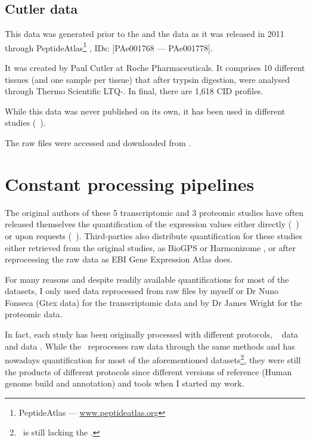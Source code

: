 \subsection{Cutler data}

This data was generated prior to the  and the 
data as it was released in 2011 through PeptideAtlas\footnote{PeptideAtlas --- %
\href{http://www.peptideatlas.org/}{www.peptideatlas.org}}
, IDs: [PAe001768 --- PAe001778].

It was created by Paul Cutler at Roche Pharmaceuticals.
It comprises 10 different tissues (and one sample per tissue) that after trypsin
digestion, were analysed through Thermo Scientific \gls{LTQ}-\orbi.
In final, there are 1,618 \gls{CID} profiles.

While this data was never published on its own, it has been used in different
studies (\eg\ ).

The raw files were accessed and downloaded from .


\section{Constant processing pipelines}

The original authors of these 5 transcriptomic and 3 proteomic studies have often
released themselves the quantification of the expression values either directly
(\eg\ \cite{Krupp2012}) or upon requests (\eg\ \cite{PandeyData}).
Third-parties also distribute
quantification for these studies either retrieved from the original studies,
as BioGPS  or Harmonizome ,
or after reprocessing the raw data as EBI Gene Expression Atlas
 does.

For many reasons and despite readily available quantifications for most of the
datasets, I only used data reprocessed from raw files by myself or Dr Nuno
Fonseca (Gtex data) for the transcriptomic data and by Dr James Wright
for the proteomic data.

In fact, each study has been originally processed with different protocols,
\eg\ \dataset{\Gtex} data  and 
data . While the \egxa\ reprocesses raw data through the same
methods and has nowadays quantification for most of the aforementioned
datasets\footnote{\egxa\ is still lacking the .},
they were still the products of different protocols since different versions of
reference (Human genome build and annotation) and tools when I started my work.

